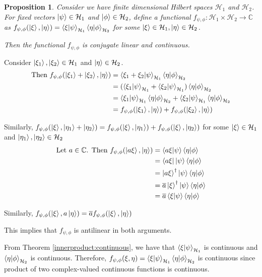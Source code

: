 \documentclass[12pt,twoside,fleqn]{report}
\makeatletter
\theoremstyle{thmstyle}
\renewenvironment{proof}[1][\proofname]{\par
\pushQED{\qed}%
\normalfont \topsep6\p@\@plus6\p@\relax
\trivlist
\item[\hskip\labelsep\itshape#1\@addpunct{.}]\mbox{}\par\nobreak\ignorespaces
}{%
    \popQED\endtrivlist\@endpefalse
    }
\newtheorem{prop}{Proposition}[chapter]
\makeatother
\begin{document}
\begin{prop}
    Consider we have finite dimensional Hilbert spaces $\mathcal{H}_1$ and $\mathcal{H}_2$. For fixed vectors $\ket{\psi} \in \mathcal{H}_1$ and $\ket{\phi} \in \mathcal{H}_2$, define a functional $f_{\psi,\phi}: \mathcal{H}_1 \times \mathcal{H}_2 \to \mathbb{C}$ as $f_{\psi,\phi}(\ket\xi, \ket\eta) = \braket{\xi|\psi}_{\mathcal{H}_1} \braket{\eta | \phi}_{\mathcal{H}_2}$ for some $\ket{\xi} \in \mathcal{H}_1, \ket{\eta} \in \mathcal{H}_2$.

    Then the functional $f_{\psi,\phi}$ is conjugate linear and continuous.
\end{prop}
\begin{proof}

    Consider $\ket{\xi_1}, \ket{\xi_2} \in \mathcal{H}_1$ and $\ket{\eta} \in \mathcal{H}_2$. 
    \begin{align*}
        \text{Then }f_{\psi,\phi}(\ket{\xi_1} + \ket{\xi_2}, \ket{\eta}) & = \braket{\xi_1 + \xi_2 | \psi}_{\mathcal{H}_1} \braket{\eta | \phi}_{\mathcal{H}_2} 
        \\ & = (\braket{\xi_1 | \psi}_{\mathcal{H}_1}+ \braket{\xi_2 | \psi}_{\mathcal{H}_1}) \braket{\eta|\phi}_{\mathcal{H}_2}
        \\ & = \braket{\xi_1| \psi}_{\mathcal{H}_1}\braket{\eta|\phi}_{\mathcal{H}_2} + \braket{\xi_2|\psi}_{\mathcal{H}_1}\braket{\eta|\phi}_{\mathcal{H}_2}
        \\ & = f_{\psi,\phi}(\ket{\xi_1}, \ket{\eta}) + f_{\psi,\phi}(\ket{\xi_2},\ket{\eta})
    \end{align*}

    Similarly, $f_{\psi,\phi}(\ket\xi, \ket{\eta_1} + \ket{\eta_2}) = f_{\psi,\phi}(\ket\xi, \ket{\eta_1}) + f_{\psi,\phi}(\ket\xi , \ket{\eta_2})$ 
    for some $\ket\xi \in \mathcal{H}_1$ and $\ket{\eta_1}, \ket{\eta_2}  \in \mathcal{H}_2$
    \begin{align*}
    \text{Let } a \in \mathbb{C}\text{. Then }f_{\psi,\phi}(\ket{a \xi},\ket{\eta}) & = \braket{a \xi|\psi}\braket{\eta|\phi} 
        \\ & = \bra{a \xi}\ket{\psi}\braket{\eta|\phi}
        \\ & = \ket{a \xi}^\dagger \ket{\psi} \braket{\eta|\phi}
        \\ & = \overline{a} \ket{\xi}^\dagger \ket{\psi} \braket{\eta|\phi}
        \\ & = \overline{a} \braket{\xi|\psi} \braket{\eta|\phi}
    \end{align*}

    Similarly, $f_{\psi,\phi}(\ket\xi, a \ket\eta) = \overline{a}f_{\psi,\phi}(\ket\xi, \ket\eta)$

    This implies that $f_{\psi,\phi}$ is antilinear in both arguments.

    \vspace{0.5cm}
    From Theorem \ref{innerproduct:continuous}, we have that $\braket{\xi|\psi}_{\mathcal{H}_1}$ is continuous and $\braket{\eta|\phi}_{\mathcal{H}_2}$ is continuous. Therefore, $f_{\psi,\phi}(\xi, \eta) =  \braket{\xi|\psi}_{\mathcal{H}_1} \braket{\eta | \phi}_{\mathcal{H}_2}$ is continuous since product of two complex-valued continuous functions is continuous.
\end{proof}
\end{document}
